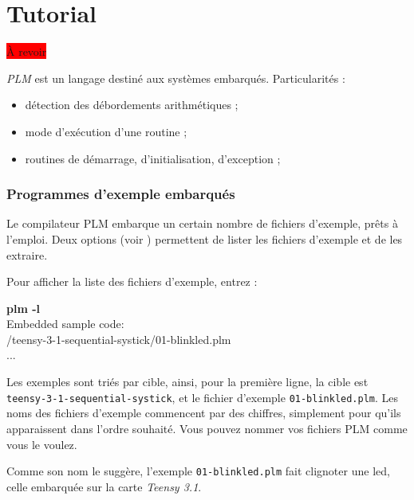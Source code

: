 

\chapter{Tutorial}

\thispagestyle{empty}

\colorbox{red}{À revoir}


\emph{PLM} est un langage destiné aux systèmes embarqués. Particularités :
\begin{itemize}
  \item détection des débordements arithmétiques ;
  \item mode d'exécution d'une routine ;
  \item routines de démarrage, d'initialisation, d'exception ;
\end{itemize}



\subsection{Programmes d'exemple embarqués}

Le compilateur PLM embarque un certain nombre de fichiers d'exemple, prêts à l'emploi. Deux options (voir ) permettent de lister les fichiers d'exemple et de les extraire.

Pour afficher la liste des fichiers d'exemple, entrez :

\begin{SHELL}
{\bfseries plm -l}\\
Embedded sample code:\\ 
\hspace*{1.2em}/teensy-3-1-sequential-systick/01-blinkled.plm\\
\hspace*{1.2em}...
\end{SHELL}

Les exemples sont triés par cible, ainsi, pour la première ligne, la cible est \texttt{teensy-3-1-sequential-systick}, et le fichier d'exemple \texttt{01-blinkled.plm}. Les noms des fichiers d'exemple commencent par des chiffres, simplement pour qu'ils apparaissent dans l'ordre souhaité. Vous pouvez nommer vos fichiers PLM comme vous le voulez.

Comme son nom le suggère, l'exemple \texttt{01-blinkled.plm} fait clignoter une led, celle embarquée sur la carte \emph{Teensy 3.1}.

